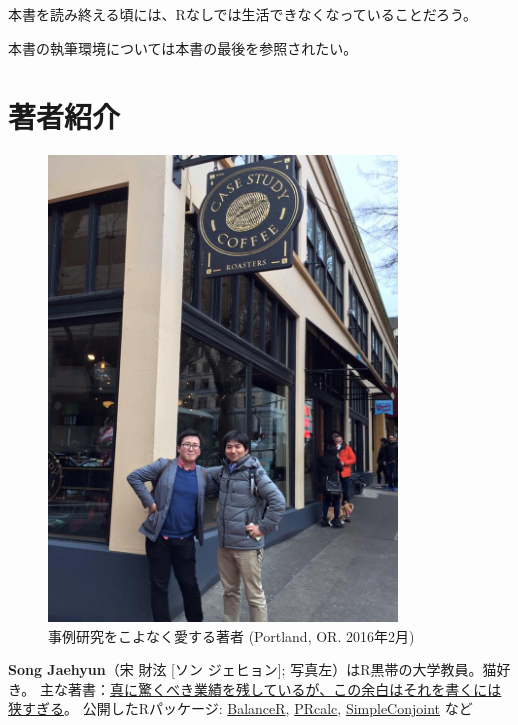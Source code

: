 \documentclass[
  a4paper,
  pandoc,
  ja=standard,
  jafont=haranoaji]{bxjsbook}
\begin{document}
本書を読み終える頃には、Rなしでは生活できなくなっていることだろう。

本書の執筆環境については本書の最後を参照されたい。

\hypertarget{ux8457ux8005ux7d39ux4ecb}{%
\section*{著者紹介}\label{ux8457ux8005ux7d39ux4ecb}}

\begin{figure}

{\centering \includegraphics[width=3.64583in,height=\textheight]{./Figs/Authors/SongYanai.jpg}

}

\caption{事例研究をこよなく愛する著者 (Portland, OR. 2016年2月)}

\end{figure}

\textbf{Song Jaehyun}（宋 財泫 {[}ソン ジェヒョン{]};
写真左）はR黒帯の大学教員。猫好き。
主な著書：\href{https://ja.wikipedia.org/wiki/フェルマーの最終定理}{真に驚くべき業績を残しているが、この余白はそれを書くには狭すぎる}。
公開したRパッケージ:
\href{https://github.com/JaehyunSong/BalanceR}{BalanceR},
\href{https://github.com/JaehyunSong/PRcalc}{PRcalc},
\href{https://github.com/JaehyunSong/SimpleConjoint}{SimpleConjoint}
など
\end{document}
